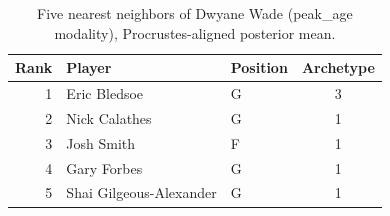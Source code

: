 \begin{table}[htbp]
  \centering\small
  \begin{tabular}{rllc}
    \toprule
    Rank & Player & Position & Archetype \\
    \midrule
    1 & Eric Bledsoe & G & 3 \\
    2 & Nick Calathes & G & 1 \\
    3 & Josh Smith & F & 1 \\
    4 & Gary Forbes & G & 1 \\
    5 & Shai Gilgeous-Alexander & G & 1 \\
    \bottomrule
  \end{tabular}
  \caption{Five nearest neighbors of Dwyane Wade (peak_age modality), Procrustes-aligned posterior mean.}
  \label{tab:Dwyane_Wade_neighbors_peak_age}
\end{table}


